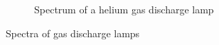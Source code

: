 \documentclass{scrartcl}
\begin{document}
\begin{figure}[!ht]
\begin{subfigure}[b]{0.49\textwidth}
      \caption{Spectrum of a helium gas discharge lamp}
      \label{fig:heliumLamp}
    \end{subfigure}
    \caption{Spectra of gas discharge lamps}
    \label{fig:lampSpectra}
\end{figure}
\FloatBarrier
\end{document}
